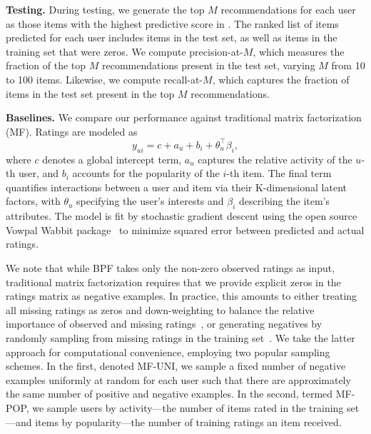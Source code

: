 {\bf Testing.} During testing, we generate the top $M$ recommendations
for each user as those items with the highest predictive score in
. The ranked list of items predicted for each user
includes items in the test set, as well as items in the training set
that were zeros. We compute precision-at-$M$, which measures the
fraction of the top $M$ recommendations present in the test set,
varying $M$ from 10 to 100 items. Likewise, we compute recall-at-$M$,
which captures the fraction of items in the test set present in the
top $M$ recommendations.



{\bf Baselines.} We compare our performance against traditional matrix
factorization (MF). Ratings are modeled as
\begin{equation*}
  y_{ui} = c + a_u + b_i + \theta_u^\top \beta_i,
\end{equation*}
where $c$ denotes a global intercept term, $a_u$ captures the relative
activity of the $u$-th user, and $b_i$ accounts for the popularity of
the $i$-th item. The final term quantifies interactions between a user
and item via their K-dimensional latent factors, with $\theta_u$ specifying
the user's interests and $\beta_i$ describing the item's attributes. The
model is fit by stochastic gradient descent using the open source
Vowpal Wabbit package~\cite{Weinberger:2009} to minimize squared error
between predicted and actual ratings.

We note that while BPF takes only the non-zero observed ratings as
input, traditional matrix factorization requires that we provide
explicit zeros in the ratings matrix as negative examples. In
practice, this amounts to either treating all missing ratings as zeros
and down-weighting to balance the relative importance of observed and
missing ratings~\cite{Hu:2008p9402}, or generating negatives by
randomly sampling from missing ratings in the training
set~\cite{Dror:2012a}.  We take the latter approach for computational
convenience, employing two popular sampling schemes. In the first,
denoted MF-UNI, we sample a fixed number of negative examples
uniformly at random for each user such that there are approximately
the same number of positive and negative examples. In the second,
termed MF-POP, we sample users by activity---the number of items rated
in the training set---and items by popularity---the number of training
ratings an item received. 

